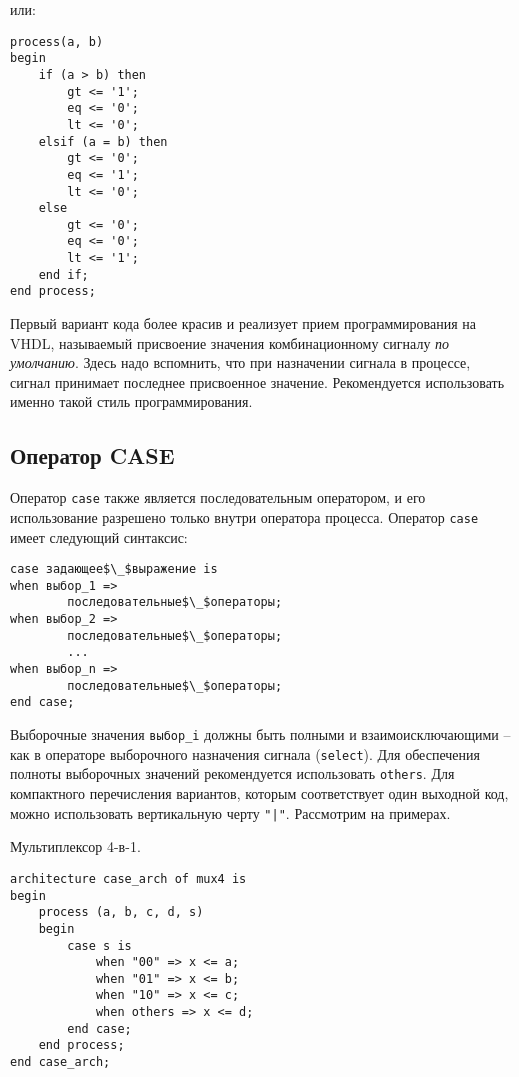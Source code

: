 или:

\begin{Code}
\begin{lstlisting}
process(a, b)
begin
    if (a > b) then
        gt <= '1';
        eq <= '0';
        lt <= '0';
    elsif (a = b) then
        gt <= '0';
        eq <= '1';
        lt <= '0';
    else
        gt <= '0';
        eq <= '0';
        lt <= '1';
    end if;
end process;
\end{lstlisting}
\end{Code}

Первый вариант кода более красив и реализует прием программирования на VHDL, называемый присвоение значения комбинационному сигналу \emph{по умолчанию}. Здесь надо вспомнить, что при назначении сигнала в процессе, сигнал принимает последнее присвоенное значение. Рекомендуется использовать именно такой стиль программирования.

\subsection{Оператор CASE}

Оператор \lstinline?case? также является последовательным оператором, и его использование разрешено только внутри оператора процесса. Оператор \lstinline?case? имеет следующий синтаксис:

\begin{Code}
\begin{lstlisting}[mathescape]
case задающее$\_$выражение is
when выбор_1 =>
        последовательные$\_$операторы;
when выбор_2 =>
        последовательные$\_$операторы;
        ...
when выбор_n =>
        последовательные$\_$операторы;
end case;
\end{lstlisting}
\end{Code}

Выборочные значения \lstinline?выбор_i? должны быть полными и взаимоисключающими – как в операторе выборочного назначения сигнала (\lstinline?select?). Для обеспечения полноты выборочных значений рекомендуется использовать \lstinline?others?. Для компактного перечисления вариантов, которым соответствует один выходной код, можно использовать вертикальную черту \lstinline?"|"?. Рассмотрим на примерах.

 Мультиплексор 4-в-1.

\begin{Code}
\begin{lstlisting}
architecture case_arch of mux4 is
begin
    process (a, b, c, d, s)
    begin
        case s is
            when "00" => x <= a;
            when "01" => x <= b;
            when "10" => x <= c;
            when others => x <= d;
        end case;
    end process;
end case_arch;
\end{lstlisting}
\end{Code}

